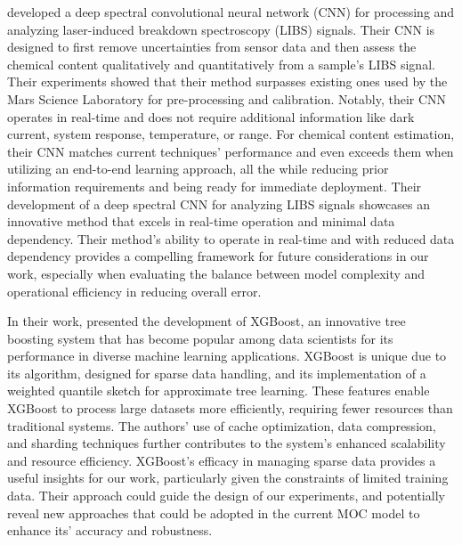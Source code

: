 \citeauthor{castorena_deep_2021} developed a deep spectral convolutional neural network (CNN) for processing and analyzing laser-induced breakdown spectroscopy (LIBS) signals.
Their CNN is designed to first remove uncertainties from sensor data and then assess the chemical content qualitatively and quantitatively from a sample's LIBS signal.
Their experiments showed that their method surpasses existing ones used by the Mars Science Laboratory for pre-processing and calibration.
Notably, their CNN operates in real-time and does not require additional information like dark current, system response, temperature, or range.
For chemical content estimation, their CNN matches current techniques' performance and even exceeds them when utilizing an end-to-end learning approach, all the while reducing prior information requirements and being ready for immediate deployment\cite{castorena_deep_2021}.
Their development of a deep spectral CNN for analyzing LIBS signals showcases an innovative method that excels in real-time operation and minimal data dependency. Their method's ability to operate in real-time and with reduced data dependency provides a compelling framework for future considerations in our work, especially when evaluating the balance between model complexity and operational efficiency in reducing overall error.

In their work, \citeauthor{chen_xgboost_2016} presented the development of XGBoost, an innovative tree boosting system that has become popular among data scientists for its performance in diverse machine learning applications. 
XGBoost is unique due to its algorithm, designed for sparse data handling, and its implementation of a weighted quantile sketch for approximate tree learning.
These features enable XGBoost to process large datasets more efficiently, requiring fewer resources than traditional systems. 
The authors' use of cache optimization, data compression, and sharding techniques further contributes to the system's enhanced scalability and resource efficiency\cite{chen_xgboost_2016}.
XGBoost's efficacy in managing sparse data provides a useful insights for our work, particularly given the constraints of limited training data. Their approach could guide the design of our experiments, and potentially reveal new approaches that could be adopted in the current MOC model to enhance its' accuracy and robustness.